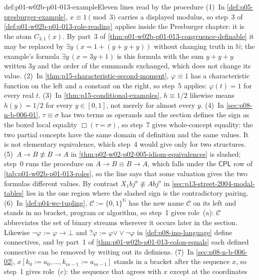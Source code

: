 \begin{hbexample}{def:p01-w02b-p01-013-example}{Eleven lines read by the procedure}
(1)~In \cref{def:p05-presburger-example}, \(x\equiv1\pmod3\) carries a
displayed modulus, so step~3 of \cref{def:p01-w02b-p01-013-role-reading}
applies inside the Presburger chapter: it is the atom \(C_{3,1}(x)\).  By
part~3 of \cref{thm:p01-w02b-p01-013-congruence-definable} it may be replaced
by \(\exists y\,(x=1+(y+y+y))\) without changing truth in \(\mathbb N\); the
example's formula \(\exists y\,(x=3y+1)\) is this formula with the sum
\(y+y+y\) written \(3y\) and the order of the summands exchanged, which does
not change its value.
(2)~In \cref{thm:p15-characteristic-second-moment}, \(\varphi\equiv1\) has a
characteristic function on the left and a constant on the right, so step~5
applies: \(\varphi(t)=1\) for every real \(t\).
(3)~In \cref{thm:p15-conditional-examples}, \(h\equiv1/2\) likewise means
\(h(y)=1/2\) for every \(y\in[0,1]\), not merely for almost every \(y\).
(4)~In \cref{sec:p08-n-b-006-01}, \(\tau\equiv\sigma\) has two terms as
operands and the section defines the sign as the boxed local equality
\(\Box(\tau=\sigma)\), so step~7 gives whole-concept equality: the two
partial concepts have the same domain of definition and the same values.
It is not elementary equivalence, which step~4 would give only for two
structures.
(5)~\(A\to B\not\equiv B\to A\) in
\cref{thm:p02-w02-p02-005-idiom-equivalences} is slashed; step~0 runs the
procedure on \(A\to B\equiv B\to A\), which falls under the \(\mathsf{CPL}\)
row of \cref{tab:p01-w02b-p01-013-roles}, so the line says that some
valuation gives the two formulas different values.  By contrast
\(X_1bj^a\not\equiv Abj^o\) in \cref{sec:p13-street-2004-modal-tables}
lies in the one region where the slashed sign is the contradictory
pairing.
(6)~In \cref{def:p04-wc-tupling}, \(\mathcal C:=\{0,1\}^{\mathbb N}\) has
the new name \(\mathcal C\) on its left and stands in no bracket, program
or algorithm, so step~1 gives role~(a): \(\mathcal C\) abbreviates the set
of binary streams wherever it occurs later in the section.  Likewise
\(\neg\varphi:=\varphi\to\bot\) and \(?\varphi:=\varphi\mathbin{\vee\!\vee}
\neg\varphi\) in \cref{def:p08-inq-language} define connectives, and by
part~1 of \cref{thm:p01-w02b-p01-013-colon-equals} each defined connective
can be removed by writing out its definiens.
(7)~In \cref{sec:p08-n-b-006-02}, \(x[k_0:=a_0,\ldots,k_{m-1}:=a_{m-1}]\)
stands in a bracket after the sequence \(x\), so step~1 gives role~(c): the
sequence that agrees with \(x\) except at the coordinates

\end{hbexample}
